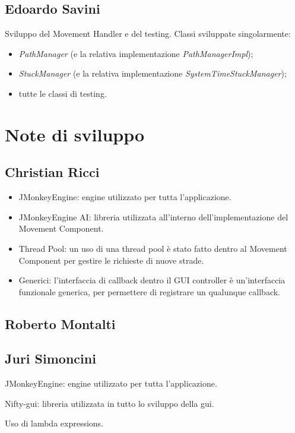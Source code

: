 \subsection{Edoardo Savini}

Sviluppo del Movement Handler e del testing.
Classi sviluppate singolarmente:
\begin{itemize}
    \item \emph{PathManager} (e la relativa implementazione \emph{PathManagerImpl});
    \item \emph{StuckManager} (e la relativa implementazione \emph{SystemTimeStuckManager});
    \item tutte le classi di testing.
\end{itemize}

\section{Note di sviluppo}

\subsection{Christian Ricci}

\begin{itemize}
\item JMonkeyEngine: engine utilizzato per tutta l'applicazione.
\item JMonkeyEngine AI: libreria utilizzata all'interno dell'implementazione del Movement Component.
\item Thread Pool: un uso di una thread pool è stato fatto dentro al Movement Component per gestire le richieste di nuove strade.
\item Generici: l'interfaccia di callback dentro il GUI controller è un'interfaccia funzionale generica, per permettere di registrare un qualunque callback.
\end{itemize}

\subsection{Roberto Montalti}

\subsection{Juri Simoncini}
\item JMonkeyEngine: engine utilizzato per tutta l'applicazione.
\item Nifty-gui: libreria utilizzata in tutto lo sviluppo della gui.
\item Uso di lambda expressions.

